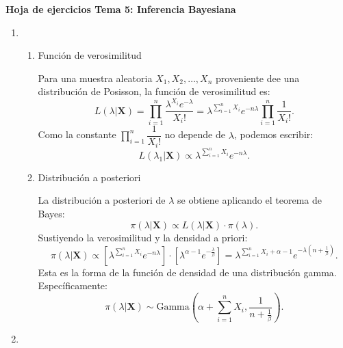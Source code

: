 \begin{center}
    \textbf{\large Hoja de ejercicios Tema 5: Inferencia Bayesiana} 
\end{center}
\begin{enumerate}[label=\color{red}\textbf{\arabic*)}]
    \item {}
    
    \begin{enumerate}[label=Paso \arabic*:]
      \item Función de verosimilitud

        Para una muestra aleatoria $X_1,X_2,\dots,X_n$ proveniente dee una distribución de Posisson, la función de verosimilitud es: \[
        L(\lambda|\mathbf{X})=\prod_{i=1}^{n} \dfrac{\lambda^{X_i}e^{-\lambda}}{X_i!}=\lambda^{\sum_{i=1}^{n} X_i}e^{-n\lambda}\prod_{i=1}^{n} \dfrac{1}{X_i!}. 
        \] 
        Como la constante $\prod_{i=1}^{n} \dfrac{1}{X_i!} $ no depende de $\lambda$, podemos escribir: \[
        L(\lambda_1|\mathbf{X})\propto \lambda^{\sum_{i=1}^{n} X_i}e^{-n\lambda}. 
        \] 
      \item Distribución a posteriori

        La distribución a posteriori de $\lambda$ se obtiene aplicando el teorema de Bayes: \[
        \pi(\lambda|\mathbf{X})\propto L(\lambda|\mathbf{X})\cdot \pi(\lambda).
        \] 
        Sustiyendo la verosimilitud y la densidad a priori: \[
        \pi(\lambda|\mathbf{X})\propto \left[ \lambda^{\sum_{i=1}^{n} X_i}e^{-n\lambda}  \right] \cdot \left[ \lambda^{\alpha-1}e^{-\frac{\lambda}{\beta} }  \right]=\lambda^{\sum_{i=1}^{n} X_i+\alpha-1}e^{-\lambda\left( n+\frac{1}{\beta}  \right) }  .
        \] 
        Esta es la forma de la función de densidad de una distribución gamma. Específicamente: \[
        \pi(\lambda|\mathbf{X})\sim \mathrm{Gamma}\left( \alpha+\sum_{i=1}^{n} X_i,\dfrac{1}{n+\frac{1}{\beta} } \right).
        \] 
    \end{enumerate}
\item {} 


\end{enumerate}
